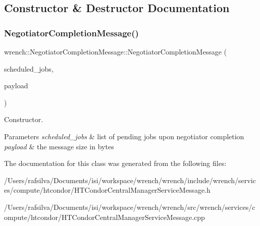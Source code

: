 \subsection{Constructor \& Destructor Documentation}
\mbox{\label{classwrench_1_1_negotiator_completion_message_aece506a0df6a8a5bf7484467f05c9b19}} 
\subsubsection{\texorpdfstring{Negotiator\+Completion\+Message()}{NegotiatorCompletionMessage()}}
{\footnotesize\ttfamily wrench\+::\+Negotiator\+Completion\+Message\+::\+Negotiator\+Completion\+Message (\begin{DoxyParamCaption}\item[{std\+::vector$<$ Standard\+Job $\ast$$>$}]{scheduled\+\_\+jobs,  }\item[{double}]{payload }\end{DoxyParamCaption})}



Constructor. 


\begin{DoxyParams}{Parameters}
{\em scheduled\+\_\+jobs} & list of pending jobs upon negotiator completion \\
\hline
{\em payload} & the message size in bytes \\
\hline
\end{DoxyParams}


The documentation for this class was generated from the following files\+:\begin{DoxyCompactItemize}
\item 
/\+Users/rafsilva/\+Documents/isi/workspace/wrench/wrench/include/wrench/services/compute/htcondor/H\+T\+Condor\+Central\+Manager\+Service\+Message.\+h\item 
/\+Users/rafsilva/\+Documents/isi/workspace/wrench/wrench/src/wrench/services/compute/htcondor/H\+T\+Condor\+Central\+Manager\+Service\+Message.\+cpp\end{DoxyCompactItemize}
